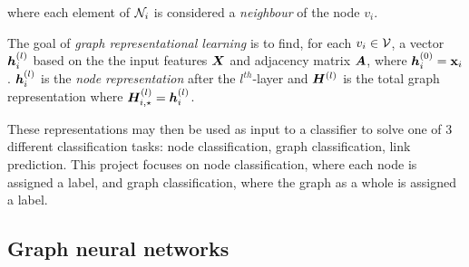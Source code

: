 where each element of ${\mathcal{N}}_i$ is considered a \emph{neighbour} of the node $v_i$.


The goal of \emph{graph representational learning} is to find, for each $v_i \in {\mathcal{V}}$, a vector ${\bm{h}}_i^{(l)}$ based on the the input features ${\bm{X}}$ and adjacency matrix ${\bm{A}}$, where ${\bm{h}}_i^{(0)} = {\textbf{x}}_i$.
${\bm{h}}_i^{(l)}$ is the \emph{node representation} after the $l^{th}$-layer and ${\bm{H}}^{(l)}$ is the total graph representation where ${\bm{H}}_{i, \star}^{(l)} = {\bm{h}}_i^{(l)}$.



These representations may then be used as input to a classifier to solve one of 3 different classification tasks: node classification, graph classification, link prediction.
This project focuses on node classification, where each node is assigned a label, and graph classification, where the graph as a whole is assigned a label.

\subsection{Graph neural networks}

